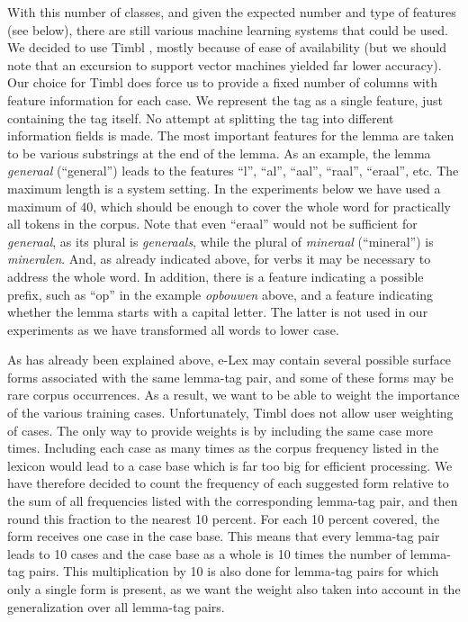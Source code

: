 \documentclass[a4paper,10pt,twoside]{article}
\begin{document}
With this number of classes, and given the expected number and type of features (see below), there are still various machine learning systems that could be used. We decided to use Timbl , mostly because of ease of availability (but we should note that an excursion to support vector machines yielded far lower accuracy). Our choice for Timbl does force us to provide a fixed number of columns with feature information for each case. We represent the tag as a single feature, just containing the tag itself. No attempt at splitting the tag into different information fields is made. The most important features for the lemma are taken to be various substrings at the end of the lemma. As an example, the lemma \textit{generaal} (``general'') leads to the features ``l'', ``al'', ``aal'', ``raal'', ``eraal'', etc. The maximum length is a system setting. In the experiments below we have used a maximum of 40, which should be enough to cover the whole word for practically all tokens in the corpus. Note that even ``eraal'' would not be sufficient for \textit{generaal}, as its plural is \textit{generaals}, while the plural of \textit{mineraal} (``mineral'') is \textit{mineralen}. And, as already indicated above, for verbs it may be necessary to address the whole word. In addition, there is a feature indicating a possible prefix, such as ``op'' in the example \textit{opbouwen} above, and a feature indicating whether the lemma starts with a capital letter. The latter is not used in our experiments as we have transformed all words to lower case.

As has already been explained above, e-Lex may contain several possible surface forms associated with the same lemma-tag pair, and some of these forms may be rare corpus occurrences. As a result, we want to be able to weight the importance of the various training cases. Unfortunately, Timbl does not allow user weighting of cases. The only way to provide weights is by including the same case more times. Including each case as many times as the corpus frequency listed in the lexicon would lead to a case base which is far too big for efficient processing. We have therefore decided to count the frequency of each suggested form relative to the sum of all frequencies listed with the corresponding lemma-tag pair, and then round this fraction to the nearest 10 percent. For each 10 percent covered, the form receives one case in the case base. This means that every lemma-tag pair leads to 10 cases and the case base as a whole is 10 times the number of lemma-tag pairs. This multiplication by 10 is also done for lemma-tag pairs for which only a single form is present, as we want the weight also taken into account in the generalization over all lemma-tag pairs.
\end{document}
